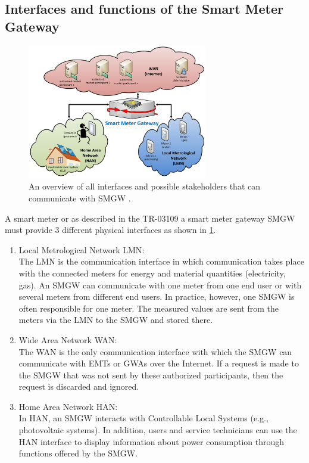 \subsection{Interfaces and functions of the Smart Meter Gateway}
\begin{figure}[tbp]
  \centering
  \includegraphics[width=0.7\textwidth]{images/interfaces_eng.png}
  \caption[Smart Meter Gateway Interfaces]{An overview of all interfaces and possible stakeholders that can communicate with SMGW \cite{Anna}.}
  \label{fig:Smart_Meter_Interfaces}
\end{figure}
A smart meter or as described in the \gls{TR-03109} a smart meter gateway \gls{SMGW} must provide 3 different physical interfaces as shown in \ref{fig:Smart_Meter_Interfaces}.
\begin{enumerate}
\item Local Metrological Network \gls{LMN}:\\
The \gls{LMN} is the communication interface in which communication takes place with the connected meters for energy and material quantities (electricity, gas). An \gls{SMGW} can communicate with one meter from one end user or with several meters from different end users. In practice, however, one \gls{SMGW} is often responsible for one meter. The measured values are sent from the meters via the \gls{LMN} to the \gls{SMGW} and stored there.
\item Wide Area Network \gls{WAN}:\\
The \gls{WAN} is the only communication interface with which the \gls{SMGW} can communicate with \gls{EMT}s or \gls{GWA}s over the Internet. If a request is made to the \gls{SMGW} that was not sent by these authorized participants, then the request is discarded and ignored.
\item Home Area Network \gls{HAN}:\\
In \gls{HAN}, an \gls{SMGW} interacts with Controllable Local Systems (e.g., photovoltaic systems). In addition, users and service technicians can use the \gls{HAN} interface to display information about power consumption through functions offered by the \gls{SMGW}.
\end{enumerate}
